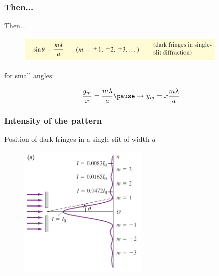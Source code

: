 \documentclass[]{beamer}
\begin{document}



 \begin{frame}
    \frametitle{Then...}
  
    \textcolor{mypink1}{Then...}
    \vspace{10mm}

    \begin{figure}[h!]
      \begin{center}
        \includegraphics[height=0.5in]{images/2.jpg}
      \end{center}
    \end{figure}

    \pause
\vspace{5mm}
    for small angles:
    \vspace{5mm}


    \pause
\begin{equation*}
    \frac{y_m}{x}=\frac{m\lambda}{a}\pause\rightarrow y_m=x\frac{m\lambda}{a}
\end{equation*}



\end{frame}




 \begin{frame}
    \frametitle{Intensity of the pattern}
  
    \textcolor{mypink1}{Position of dark fringes in a single slit of width $a$}
    \begin{figure}[h!]
      \begin{center}
        \includegraphics[height=2.5in]{images/3.jpg}
      \end{center}
    \end{figure}

  \end{frame}
    
\end{document}
